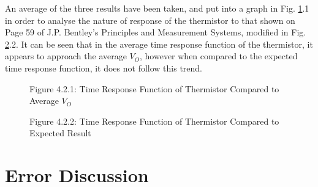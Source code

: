 \documentclass[a4,11pt]{article}
\begin{document}
An average of the three results have been taken, and put into a graph in Fig. \ref{fig:timeresponseresult}.1 in order to analyse the nature of response of the thermistor to that shown on Page 59 of J.P. Bentley's Principles and Measurement Systems, modified in Fig. \ref{fig:timeresponseideal}.2. It can be seen that in the average time response function of the thermistor, it appears to approach the average $V_O$, however when compared to the expected time response function, it does not follow this trend.

\begin{figure}[H]
	\centering
	\label{fig:timeresponseresult}
	Figure 4.2.1: Time Response Function of Thermistor Compared to Average $V_O$
\end{figure}

\begin{figure}[H]
	\centering
	\label{fig:timeresponseideal}
	Figure 4.2.2: Time Response Function of Thermistor Compared to Expected Result
\end{figure}

\section{Error Discussion}
\label{sec:error}
\end{document}

